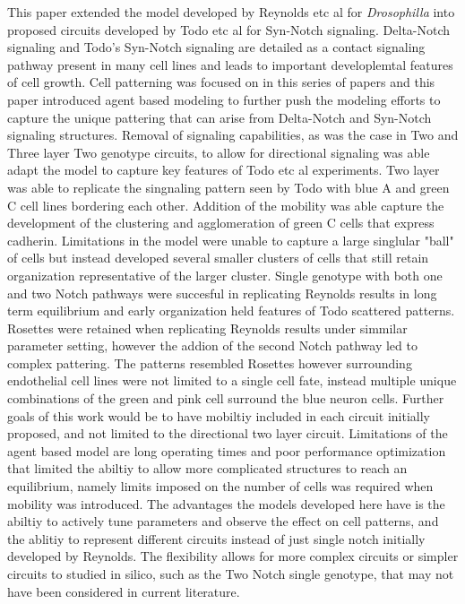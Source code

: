 \documentclass[12pt]{ifacconf}
\begin{document}
This paper extended the model developed by Reynolds etc al for \emph{Drosophilla} into proposed circuits developed by Todo etc al for Syn-Notch signaling. Delta-Notch signaling and Todo's Syn-Notch signaling are detailed as a contact signaling pathway present in many cell lines and leads to important developlemtal features of cell growth. Cell patterning was focused on in this series of papers and this paper introduced agent based modeling to further push the modeling efforts to capture the unique pattering that can arise from Delta-Notch and Syn-Notch signaling structures. Removal of signaling capabilities, as was the case in Two and Three layer Two genotype circuits, to allow for directional signaling was able adapt the model to capture key features of Todo etc al experiments. Two layer was able to replicate the singnaling pattern seen by Todo with blue A and green C cell lines bordering each other. Addition of the mobility was able capture the development of the clustering and agglomeration of green C cells that express cadherin. Limitations in the model were unable to capture a large singlular "ball" of cells but instead developed several smaller clusters of cells that still retain organization representative of the larger cluster. Single genotype with both one and two Notch pathways were succesful in replicating Reynolds results in long term equilibrium and early organization held features of Todo scattered patterns. Rosettes were retained when replicating Reynolds results under simmilar parameter setting, however the addion of the second Notch pathway led to complex pattering. The patterns resembled Rosettes however surrounding endothelial cell lines were not limited to a single cell fate, instead multiple unique combinations of the green and pink cell surround the blue neuron cells. Further goals of this work would be to have mobiltiy included in each circuit initially proposed, and not limited to the directional two layer circuit. Limitations of the agent based model are long operating times and poor performance optimization that limited the abiltiy to allow more complicated structures to reach an equilibrium, namely limits imposed on the number of cells was required when mobility was introduced. The advantages the models developed here have is the abiltiy to actively tune parameters and observe the effect on cell patterns, and the ablitiy to represent different circuits instead of just single notch initially developed by Reynolds. The flexibility allows for more complex circuits or simpler circuits to studied in silico, such as the Two Notch single genotype, that may not have been considered in current literature.
\end{document}
